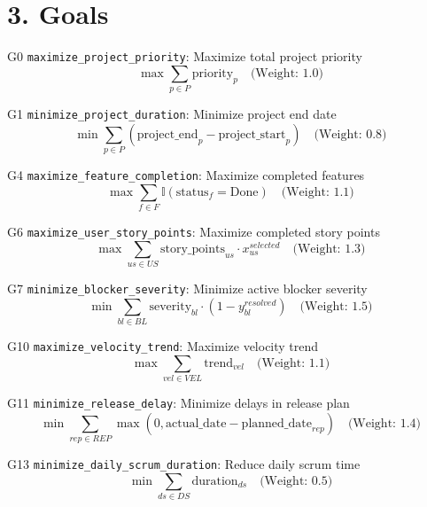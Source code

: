 \documentclass[12pt]{article}
\begin{document}
\section{3. Goals}
\item[G0] \texttt{maximize\_project\_priority}: Maximize total project priority
    \[
    \max \sum_{p \in P} \text{priority}_p \quad \text{(Weight: 1.0)}
    \]
    \item[G1] \texttt{minimize\_project\_duration}: Minimize project end date
    \[
    \min \sum_{p \in P} (\text{project\_end}_p - \text{project\_start}_p) \quad \text{(Weight: 0.8)}
    \]
    \item[G4] \texttt{maximize\_feature\_completion}: Maximize completed features
    \[
    \max \sum_{f \in F} \mathbb{I}(\text{status}_f = \text{Done}) \quad \text{(Weight: 1.1)}
    \]
    \item[G6] \texttt{maximize\_user\_story\_points}: Maximize completed story points
    \[
    \max \sum_{us \in US} \text{story\_points}_{us} \cdot x_{us}^{selected} \quad \text{(Weight: 1.3)}
    \]
    \item[G7] \texttt{minimize\_blocker\_severity}: Minimize active blocker severity
    \[
    \min \sum_{bl \in BL} \text{severity}_{bl} \cdot (1 - y_{bl}^{resolved}) \quad \text{(Weight: 1.5)}
    \]
    \item[G10] \texttt{maximize\_velocity\_trend}: Maximize velocity trend
    \[
    \max \sum_{vel \in VEL} \text{trend}_{vel} \quad \text{(Weight: 1.1)}
    \]
    \item[G11] \texttt{minimize\_release\_delay}: Minimize delays in release plan
    \[
    \min \sum_{rep \in REP} \max(0, \text{actual\_date} - \text{planned\_date}_{rep}) \quad \text{(Weight: 1.4)}
    \]
    \item[G13] \texttt{minimize\_daily\_scrum\_duration}: Reduce daily scrum time
    \[
    \min \sum_{ds \in DS} \text{duration}_{ds} \quad \text{(Weight: 0.5)}
    \]
\end{document}
